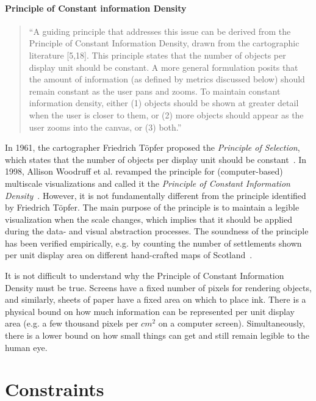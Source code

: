 \documentclass[11pt, oneside]{report}   	%
\begin{document}
\paragraph{Principle of Constant information Density}

\begin{quote}
``A guiding principle that addresses this issue can be derived from the Principle of Constant Information Density, drawn from the cartographic literature [5,18]. This principle states that the number of objects per display unit should be constant. A more general formulation posits that the amount of information (as defined by metrics discussed below) should remain constant as the user pans and zooms. To maintain constant information density, either (1) objects should be shown at greater detail when the user is closer to them, or (2) more objects should appear as the user zooms into the canvas, or (3) both.''
\end{quote}

In 1961, the cartographer Friedrich T\"{o}pfer proposed the \emph{Principle of Selection}, which states that the number of objects per display unit should be constant~\cite{topfer1966principles}. In 1998, Allison Woodruff et al. revamped the principle for (computer-based) multiscale visualizations and called it the \emph{Principle of Constant Information Density}~\cite{woodruff1998constant}. However, it is not fundamentally different from the principle identified by Friedrich T\"{o}pfer. The main purpose of the principle is to maintain a legible visualization when the scale changes, which implies that it should be applied during the data- and visual abstraction processes. The soundness of the principle has been verified empirically, e.g. by counting the number of settlements shown per unit display area on different hand-crafted maps of Scotland~\cite{topfer1966principles}. 

It is not difficult to understand why the Principle of Constant Information Density must be true. Screens have a fixed number of pixels for rendering objects, and similarly, sheets of paper have a fixed area on which to place ink. There is a physical bound on how much information can be represented per unit display area (e.g. a few thousand pixels per $cm^2$ on a computer screen). Simultaneously, there is a lower bound on how small things can get and still remain legible to the human eye.

\section{Constraints}
\end{document}
